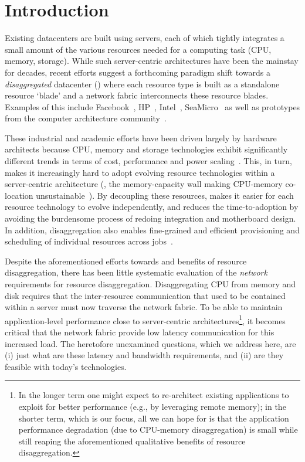 \section{Introduction}
\label{sec:intro}
Existing datacenters are built using servers, each of which tightly integrates a small amount of the various resources needed for a computing task (CPU, memory, storage). While such server-centric architectures have been the mainstay for decades, recent efforts suggest a forthcoming paradigm shift towards a {\em disaggregated} datacenter (\dis) where each resource type is built as a standalone resource `blade' and a network fabric interconnects these resource blades. Examples of this include Facebook~\cite{fdr}, HP~\cite{hptm}, Intel~\cite{rsa}, SeaMicro~\cite{seamicro} as well as prototypes from the computer architecture community~\cite{firebox, sonuma, ddcHwDesign1}. 

These industrial and academic efforts have been driven largely by hardware architects because CPU, memory and storage technologies exhibit significantly different trends in terms of cost, performance and power scaling~\cite{memristors,nvram,reg-ex-hardware,gpus}. This, in turn, makes it increasingly hard to adopt evolving resource technologies within a server-centric architecture (\eg, the memory-capacity wall making CPU-memory co-location unsustainable~\cite{ddcHwDesign1}). By decoupling these resources, \dis makes it easier for each resource technology to evolve independently, and reduces the time-to-adoption by avoiding the burdensome process of redoing integration and motherboard design. In addition, disaggregation also enables fine-grained and efficient provisioning and scheduling of individual resources across jobs~\cite{hotnets}. 

Despite the aforementioned efforts towards and benefits of resource disaggregation, there has been little systematic evaluation of the \emph{network} requirements for resource disaggregation. Disaggregating CPU from memory and disk requires that the inter-resource communication that used to be contained within a server must now traverse the network fabric. To be able to maintain application-level performance close to server-centric architectures{\footnote{In the longer term one might expect to re-architect existing applications to exploit \dis for better performance (e.g., by leveraging remote memory); in the shorter term, which is our focus, all we can hope for is that the application performance degradation (due to CPU-memory disaggregation) is small while still reaping the aforementioned qualitative benefits of resource disaggregation.}}, it becomes critical that the network fabric provide low latency communication for this increased load. The heretofore unexamined questions, which we address here, are (i) just what are these latency and bandwidth requirements, and (ii) are they feasible with today's technologies.

